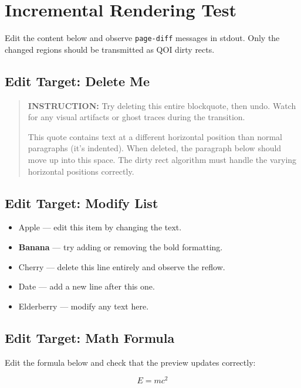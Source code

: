 \documentclass[12pt,a4paper]{article}
\begin{document}
\section{Incremental Rendering Test}
\label{sec:incremental}

Edit the content below and observe \texttt{page-diff} messages in stdout.
Only the changed regions should be transmitted as QOI dirty rects.

\subsection{Edit Target: Delete Me}

\begin{quote}
\textbf{INSTRUCTION:} Try deleting this entire blockquote, then undo.
Watch for any visual artifacts or ghost traces during the transition.

This quote contains text at a different horizontal position than normal
paragraphs (it's indented). When deleted, the paragraph below should move
up into this space. The dirty rect algorithm must handle the varying
horizontal positions correctly.
\end{quote}

\subsection{Edit Target: Modify List}

\begin{itemize}
  \item Apple — edit this item by changing the text.
  \item \textbf{Banana} — try adding or removing the bold formatting.
  \item Cherry — delete this line entirely and observe the reflow.
  \item Date — add a new line after this one.
  \item Elderberry — modify any text here.
\end{itemize}

\subsection{Edit Target: Math Formula}

Edit the formula below and check that the preview updates correctly:

\begin{equation}
  E = mc^{2}
  \label{eq:emc2}
\end{equation}
\end{document}
